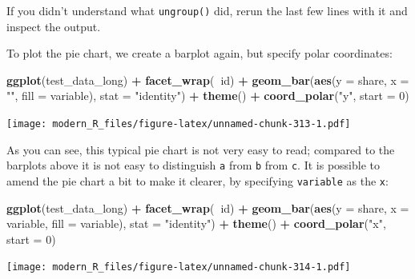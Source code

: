 \documentclass[]{gitbook}
\newenvironment{Shaded}{\begin{snugshade}}{\end{snugshade}}
\newcommand{\DataTypeTok}[1]{\textcolor[rgb]{0.13,0.29,0.53}{#1}}
\newcommand{\DecValTok}[1]{\textcolor[rgb]{0.00,0.00,0.81}{#1}}
\newcommand{\KeywordTok}[1]{\textcolor[rgb]{0.13,0.29,0.53}{\textbf{#1}}}
\newcommand{\NormalTok}[1]{#1}
\newcommand{\OperatorTok}[1]{\textcolor[rgb]{0.81,0.36,0.00}{\textbf{#1}}}
\newcommand{\StringTok}[1]{\textcolor[rgb]{0.31,0.60,0.02}{#1}}
\theoremstyle{definition}
\theoremstyle{definition}
\theoremstyle{definition}
\theoremstyle{remark}
\begin{document}
If you didn't understand what \texttt{ungroup()} did, rerun the last few
lines with it and inspect the output.

To plot the pie chart, we create a barplot again, but specify polar
coordinates:

\begin{Shaded}
\begin{Highlighting}[]
\KeywordTok{ggplot}\NormalTok{(test_data_long) }\OperatorTok{+}
\StringTok{  }\KeywordTok{facet_wrap}\NormalTok{(}\OperatorTok{~}\NormalTok{id) }\OperatorTok{+}
\StringTok{  }\KeywordTok{geom_bar}\NormalTok{(}\KeywordTok{aes}\NormalTok{(}\DataTypeTok{y =}\NormalTok{ share, }\DataTypeTok{x =} \StringTok{""}\NormalTok{, }\DataTypeTok{fill =}\NormalTok{ variable), }\DataTypeTok{stat =} \StringTok{"identity"}\NormalTok{) }\OperatorTok{+}
\StringTok{  }\KeywordTok{theme}\NormalTok{() }\OperatorTok{+}
\StringTok{  }\KeywordTok{coord_polar}\NormalTok{(}\StringTok{"y"}\NormalTok{, }\DataTypeTok{start =} \DecValTok{0}\NormalTok{)}
\end{Highlighting}
\end{Shaded}

\texttt{[image: modern\_R\_files/figure-latex/unnamed-chunk-313-1.pdf]}

As you can see, this typical pie chart is not very easy to read;
compared to the barplots above it is not easy to distinguish \texttt{a}
from \texttt{b} from \texttt{c}. It is possible to amend the pie chart a
bit to make it clearer, by specifying \texttt{variable} as the
\texttt{x}:

\begin{Shaded}
\begin{Highlighting}[]
\KeywordTok{ggplot}\NormalTok{(test_data_long) }\OperatorTok{+}
\StringTok{  }\KeywordTok{facet_wrap}\NormalTok{(}\OperatorTok{~}\NormalTok{id) }\OperatorTok{+}
\StringTok{  }\KeywordTok{geom_bar}\NormalTok{(}\KeywordTok{aes}\NormalTok{(}\DataTypeTok{y =}\NormalTok{ share, }\DataTypeTok{x =}\NormalTok{ variable, }\DataTypeTok{fill =}\NormalTok{ variable), }\DataTypeTok{stat =} \StringTok{"identity"}\NormalTok{) }\OperatorTok{+}
\StringTok{  }\KeywordTok{theme}\NormalTok{() }\OperatorTok{+}
\StringTok{  }\KeywordTok{coord_polar}\NormalTok{(}\StringTok{"x"}\NormalTok{, }\DataTypeTok{start =} \DecValTok{0}\NormalTok{)}
\end{Highlighting}
\end{Shaded}

\texttt{[image: modern\_R\_files/figure-latex/unnamed-chunk-314-1.pdf]}
\end{document}
